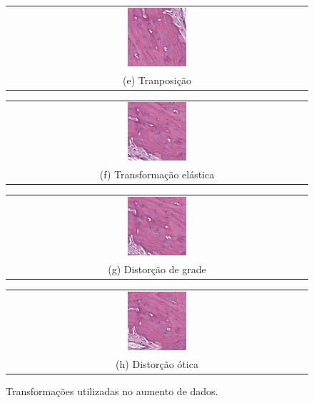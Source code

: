 \begin{figure}[h]
    
    \begin{tabular}{@{}c@{}}
        \includegraphics[width=0.2\textwidth]{figures/3_methods/transformations/205_r3c7_transpose.png}\\[\abovecaptionskip]
    \small (e) Tranposição
    \end{tabular}
    \begin{tabular}{@{}c@{}}
        \includegraphics[width=0.2\textwidth]{figures/3_methods/transformations/205_r3c7_elastic_transformation.png}\\[\abovecaptionskip]
    \small (f) Transformação elástica
    \end{tabular}
    \begin{tabular}{@{}c@{}}
        \includegraphics[width=0.2\textwidth]{figures/3_methods/transformations/205_r3c7_grid_distortion.png}\\[\abovecaptionskip]
    \small (g) Distorção de grade
    \end{tabular}
    \begin{tabular}{@{}c@{}}
        \includegraphics[width=0.2\textwidth]{figures/3_methods/transformations/205_r3c7_optical_distortion.png}\\[\abovecaptionskip]
    \small (h) Distorção ótica
    \end{tabular}
  
    \caption{Transformações utilizadas no aumento de dados.}
    \label{fig:aug-examples}
\end{figure}

